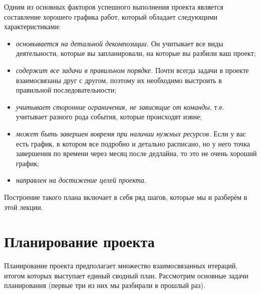 \documentclass{../../text-style}
\begin{document}
\maketitle
\thispagestyle{empty}


Одним из основных факторов успешного выполнения проекта является составление хорошего графика работ, который обладает следующими характеристиками:

\begin{itemize}
    \item \emph{основывается на детальной декомпозиции.} Он учитывает все виды деятельности, которые вы запланировали, на которые вы разбили ваш проект;
    \item \emph{содержит все задачи в правильном порядке.} Почти всегда задачи в проекте взаимосвязаны друг с другом, поэтому их необходимо выстроить в правильной последовательности;
    \item \emph{учитывает сторонние ограничения, не зависящие от команды}, т.е. учитывает разного рода события, которые происходят извне;
    \item \emph{может быть завершен вовремя при наличии нужных ресурсов.} Если у вас есть график, в котором все подробно и детально расписано, но у него точка завершения по времени через месяц после дедлайна, то это не очень хороший график;
    \item \emph{направлен на достижение целей проекта.}
\end{itemize}

Построение такого плана включает в себя ряд шагов, которые мы и разберём в этой лекции.

\section{Планирование проекта}

Планирование проекта предполагает множество взаимосвязанных итераций, итогом которых выступает единый сводный план. Рассмотрим основные задачи планирования (первые три из них мы разбирали в прошлый раз).
\end{document}
